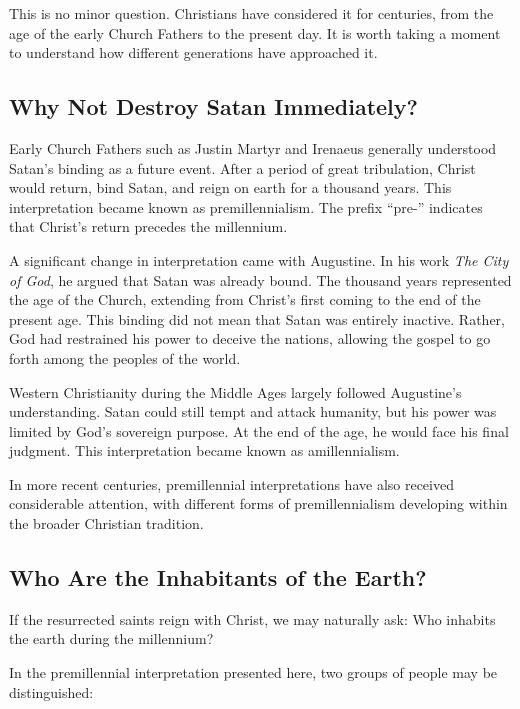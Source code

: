 This is no minor question. Christians have considered it for centuries, from the age of the early Church Fathers to the present day. It is worth taking a moment to understand how different generations have approached it.

\subsection{Why Not Destroy Satan Immediately?}

Early Church Fathers such as Justin Martyr and Irenaeus generally understood Satan's binding as a future event. After a period of great tribulation, Christ would return, bind Satan, and reign on earth for a thousand years. This interpretation became known as premillennialism. The prefix ``pre-'' indicates that Christ's return precedes the millennium.

A significant change in interpretation came with Augustine. In his work \textit{The City of God}, he argued that Satan was already bound. The thousand years represented the age of the Church, extending from Christ's first coming to the end of the present age. This binding did not mean that Satan was entirely inactive. Rather, God had restrained his power to deceive the nations, allowing the gospel to go forth among the peoples of the world.

Western Christianity during the Middle Ages largely followed Augustine's understanding. Satan could still tempt and attack humanity, but his power was limited by God's sovereign purpose. At the end of the age, he would face his final judgment. This interpretation became known as amillennialism.

In more recent centuries, premillennial interpretations have also received considerable attention, with different forms of premillennialism developing within the broader Christian tradition.

\subsection{Who Are the Inhabitants of the Earth?}

If the resurrected saints reign with Christ, we may naturally ask: Who inhabits the earth during the millennium?

In the premillennial interpretation presented here, two groups of people may be distinguished:

